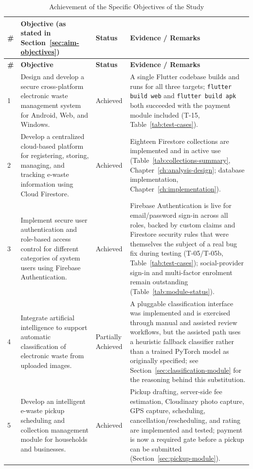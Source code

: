 \begin{longtable}{@{}p{0.6cm}p{6.6cm}p{2.4cm}p{4.3cm}@{}}
\caption{Achievement of the Specific Objectives of the Study} \label{tab:objective-achievement} \\
\toprule \textbf{\#} & \textbf{Objective (as stated in Section~\ref{sec:aim-objectives})} & \textbf{Status} & \textbf{Evidence / Remarks} \\ \midrule
\endfirsthead
\toprule \textbf{\#} & \textbf{Objective} & \textbf{Status} & \textbf{Evidence / Remarks} \\ \midrule
\endhead
1 & Design and develop a secure cross-platform electronic waste management system for Android, Web, and Windows. & Achieved & A single Flutter codebase builds and runs for all three targets; \texttt{flutter build web} and \texttt{flutter build apk} both succeeded with the payment module included (T-15, Table~\ref{tab:test-cases}). \\
2 & Develop a centralized cloud-based platform for registering, storing, managing, and tracking e-waste information using Cloud Firestore. & Achieved & Eighteen Firestore collections are implemented and in active use (Table~\ref{tab:collections-summary}, Chapter~\ref{ch:analysis-design}; database implementation, Chapter~\ref{ch:implementation}). \\
3 & Implement secure user authentication and role-based access control for different categories of system users using Firebase Authentication. & Achieved & Firebase Authentication is live for email/password sign-in across all roles, backed by custom claims and Firestore security rules that were themselves the subject of a real bug fix during testing (T-05/T-05b, Table~\ref{tab:test-cases}); social-provider sign-in and multi-factor enrolment remain outstanding (Table~\ref{tab:module-status}). \\
4 & Integrate artificial intelligence to support automatic classification of electronic waste from uploaded images. & Partially Achieved & A pluggable classification interface was implemented and is exercised through manual and assisted review workflows, but the assisted path uses a heuristic fallback classifier rather than a trained PyTorch model as originally specified; see Section~\ref{sec:classification-module} for the reasoning behind this substitution. \\
5 & Develop an intelligent e-waste pickup scheduling and collection management module for households and businesses. & Achieved & Pickup drafting, server-side fee estimation, Cloudinary photo capture, GPS capture, scheduling, cancellation/rescheduling, and rating are implemented and tested; payment is now a required gate before a pickup can be submitted (Section~\ref{sec:pickup-module}). \\

\end{longtable}
